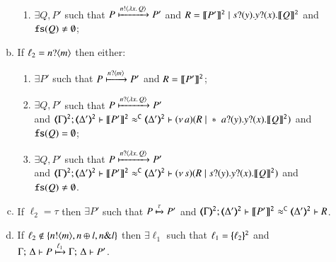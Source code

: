 \begin{enumerate}[1.]
\begin{enumerate}[a)]
\begin{enumerate}[-]
					\item	$\exists Q, P'$ such that $P \xmapsto{n !\langle \lambda x.\,Q \rangle} P'$
						and $R = \llbracket P'\rrbracket^\mathtt{2} \;|\; s ? (y) . y ? (x) . \llbracket Q\rrbracket^\mathtt{2}$
						and {$\mathtt{fs}(Q) \neq \emptyset$};
					\end{enumerate}

				\item   %
					If  $\ell_2 = n ? \langle m \rangle$ 
					then either:
					\begin{enumerate}[-]
					\item	$\exists P'$ such that $P \xmapsto{n ?\langle m \rangle} P'$
						and $R = \llbracket P'\rrbracket^\mathtt{2}$;

					\item	$\exists Q, P'$ such that
						$P \xmapsto{n ?\langle \lambda x.\,Q \rangle} P'$\\
						and $\horel{\tmap{\Gamma}{2}}{\tmap{\Delta'}{2}}{\pmap{P'}{2}}{\fwb}{\tmap{\Delta'}{2}}{\news{a}(R \Par \repl{} \binp{a}{y} \binp{y}{x} \pmap{Q}{2})}$ and {$\mathtt{fs}(Q) = \emptyset$}; 
					\item	$\exists Q, P'$ such that
						$P \xmapsto{n ?\langle \lambda x.\,Q \rangle} P'$\\
						and $\horel{\tmap{\Gamma}{2}}{\tmap{\Delta'}{2}}{\pmap{P'}{2}}{\fwb}{\tmap{\Delta'}{2}}{\news{s}(R \Par \binp{s}{y} \binp{y}{x} \pmap{Q}{2})}$  and {$\mathtt{fs}(Q) \neq \emptyset$}.
					\end{enumerate}
		
				\item   
					If  %
					$\ell_2 = \tau$ 
					then $\exists P'$ such that
					$P \xmapsto{\tau} P'$
					and $\horel{\tmap{\Gamma}{2}}{\tmap{\Delta'}{2}}{\pmap{P'}{2}}{\fwb}{\tmap{\Delta'}{2}}{R}$.
				\item	 
					If  
					$\ell_2 \not\in \{n ! \langle m \rangle, n \oplus l, n \& l\}$ 
					 then 
					$\exists \ell_1$ such that 
					$\ell_1 = \{\!\!\{\ell_2\}\!\!\}^{\mathtt{2}}$ and \\
					$ \Gamma ;\, \Delta  \vdash   P
					\xmapsto{\ell_1}
					\Gamma ;\, \Delta  \vdash   P'$.
		\end{enumerate}
	\end{enumerate}